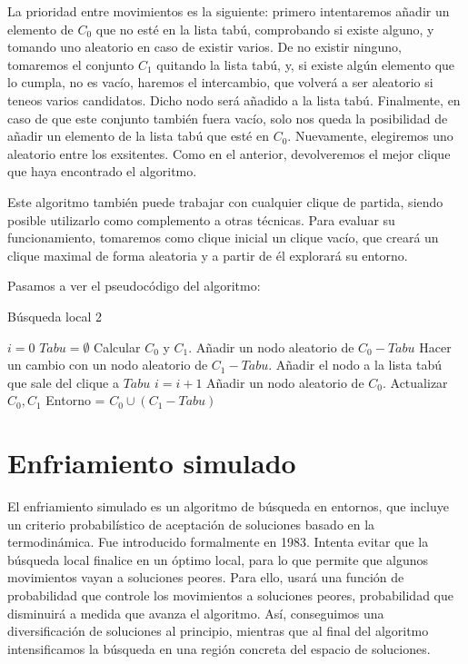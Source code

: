 La prioridad entre movimientos es la siguiente: primero intentaremos añadir un elemento de
$C_0$ que no esté en la lista tabú, comprobando si existe alguno, y tomando uno aleatorio
en caso de existir varios. De no existir ninguno, tomaremos el conjunto $C_1$ quitando
la lista tabú, y, si existe algún elemento que lo cumpla, no es vacío, haremos el intercambio,
que volverá a ser aleatorio si teneos varios candidatos. Dicho nodo será añadido a la lista tabú.
Finalmente, en caso de que este conjunto también fuera vacío, solo nos queda la posibilidad de añadir un
elemento de la lista tabú que esté en $C_0$. Nuevamente, elegiremos uno aleatorio entre los exsitentes.
Como en el anterior, devolveremos el mejor clique que haya encontrado el algoritmo.

Este algoritmo también puede trabajar con cualquier clique de partida, siendo posible utilizarlo como
complemento a otras técnicas. Para evaluar su funcionamiento, tomaremos como clique inicial un clique
vacío, que creará un clique maximal de forma aleatoria y a partir de él explorará su entorno.

Pasamos a ver el pseudocódigo del algoritmo:

\begin{algorithm}[H]
\caption{Búsqueda local 2}
  \begin{algorithmic}
    \State $i = 0$
    \State $Tabu = \emptyset$
    \State Calcular $C_0$ y $C_1$.
    \Repeat
        \State Añadir un nodo aleatorio de $C_0 - Tabu$
        \State Hacer un cambio con un nodo aleatorio de $C_1 - Tabu$.
        \State Añadir el nodo a la lista tabú que sale del clique a $Tabu$
        \State $i = i + 1$
        \State Añadir un nodo aleatorio de $C_0$.
      \EndIf
      \State Actualizar $C_0, C_1$
      \State Entorno = $C_0 \cup (C_1 - Tabu)$
  \end{algorithmic}
\end{algorithm}

\section{Enfriamiento simulado}

El enfriamiento simulado es un algoritmo de búsqueda en entornos, que incluye un criterio probabilístico
de aceptación de soluciones basado en la termodinámica. Fue introducido formalmente en 1983.
Intenta evitar que la búsqueda local finalice en un óptimo local, para lo que permite que algunos
movimientos vayan a soluciones peores. Para ello, usará una función de probabilidad que controle
los movimientos a soluciones peores, probabilidad que disminuirá a medida que avanza el algoritmo.
Así, conseguimos una diversificación de soluciones al principio, mientras que al final del algoritmo
intensificamos la búsqueda en una región concreta del espacio de soluciones.

